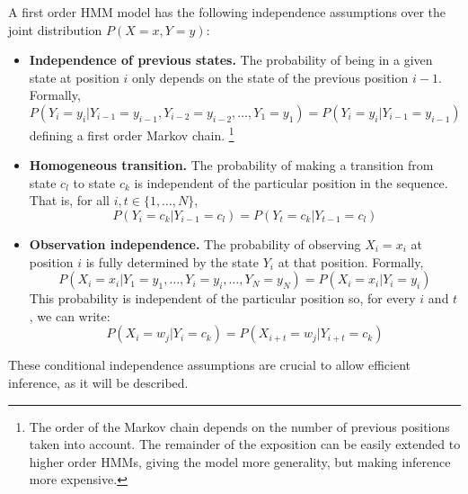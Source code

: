 A first order HMM model has the following independence assumptions over the joint distribution $P(X=x,Y=y)$:
\begin{itemize}
  \item \textbf{Independence of previous states.} The probability of
    being in a given state at position $i$ only depends on
    the state of the previous position $i-1$. Formally, 
    \begin{equation*}
    P (Y_i = y_i | Y_{i-1} = y_{i-1}, Y_{i-2} = y_{i-2}, \ldots, Y_1 = y_1) = P (Y_i = y_i | Y_{i-1} = y_{i-1})
    \end{equation*} 
    defining a first order Markov chain.%
    \footnote{The order of the Markov chain depends on the number of previous positions taken into account. 
    The remainder of the exposition can be easily extended to higher order HMMs, giving the model more generality, 
    but making inference more expensive.}
  \item \textbf{Homogeneous transition.} The probability of
    making a transition from state $c_l$ to state $c_k$ is independent of
    the particular position in the sequence. That is, for all $i,t \in \{1,\ldots,N\}$,
     \begin{equation*}
    P (Y_i = c_k | Y_{i-1} = c_l) =  P (Y_{t} = c_k | Y_{t-1} = c_l)
     \end{equation*}
  \item \textbf{Observation independence.}  The probability of
    observing $X_i = x_i$ at position $i$ is fully determined by the state $Y_i$
    at that position. Formally, 
     \begin{equation*}
     P (X_i = x_i | Y_1=y_1, \ldots, Y_i=y_i, \ldots, Y_N=y_N) = P(X_i = x_i | Y_i = y_i)
      \end{equation*}
      This probability is independent of the
    particular position so, for every $i$ and $t$, we can write:  
     \begin{equation*}
    P(X_i = w_j | Y_i = c_k) = P(X_{i+t} = w_j | Y_{i+t} = c_k)
     \end{equation*}
\end{itemize}
These conditional independence assumptions are crucial to allow
efficient inference, as it will be described.

